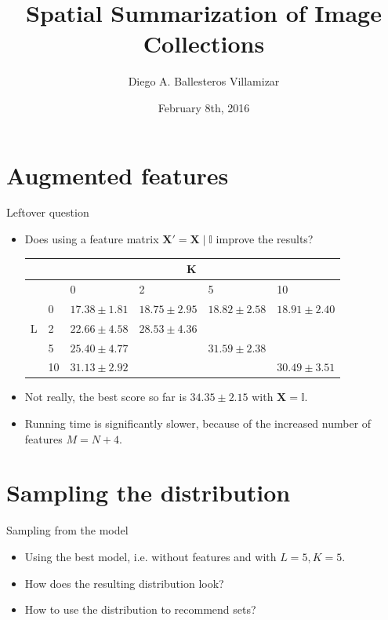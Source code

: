\documentclass{beamer}
\title[M.Sc. Thesis 2015]{Spatial Summarization of Image Collections}
\author{Diego A. Ballesteros Villamizar}
\institute[ETHZ]{ETH Zürich}
\date{February 8th, 2016}
\begin{document}
\begin{frame}
  \titlepage
\end{frame}

\section{Augmented features}

\begin{frame}{Leftover question}
  \begin{itemize}
    \item Does using a feature matrix $\mathbf{X}' = \mathbf{X} \mid \mathbb{I}$ improve the results?
    \begin{table}
      \begin{tabular}{l|lllll}
        \hline
        & \multicolumn{5}{c}{K} \\
        \hline
        \multirow{5}{*}{L} & & 0 & 2 & 5 & 10 \\
        & 0 & $17.38 \pm 1.81$ & $18.75 \pm 2.95$ & $18.82 \pm 2.58$ & $18.91 \pm 2.40$ \\
        & 2 & $22.66 \pm 4.58$ & $28.53 \pm 4.36$ &&\\
        & 5 & $25.40 \pm 4.77$ && $31.59 \pm 2.38$ &\\
        & 10 & $31.13 \pm 2.92$ &&& $30.49 \pm 3.51$ \\
      \end{tabular}
    \end{table}
    \item Not really, the best score so far is $34.35 \pm 2.15$ with $\mathbf{X} = \mathbb{I}$.
    \item Running time is significantly slower, because of the increased number of features $M = N + 4$.
  \end{itemize}
\end{frame}

\section{Sampling the distribution}

\begin{frame}{Sampling from the model}
  \begin{itemize}
    \item Using the best model, i.e. without features and with $L = 5, K=5$.
    \item How does the resulting distribution look?
    \item How to use the distribution to recommend sets?
  \end{itemize}
\end{frame}
\end{document}
